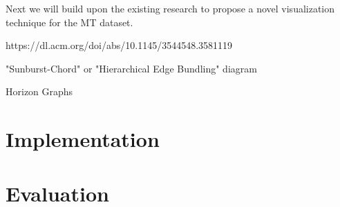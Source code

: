 \documentclass{vgtc}
\begin{document}
Next we will build upon the existing research to propose a novel visualization technique for the MT dataset.



https://dl.acm.org/doi/abs/10.1145/3544548.3581119

"Sunburst-Chord" or "Hierarchical Edge Bundling" diagram

Horizon Graphs

\section{Implementation} %

\section{Evaluation} %








% 

% 
% 
% 


\end{document}
